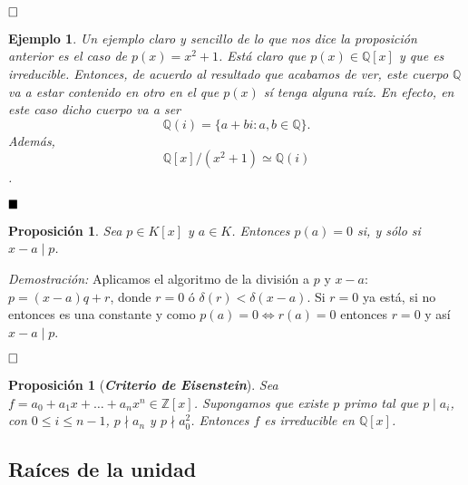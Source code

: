 \documentclass[12pt]{article}
\newtheorem{proposition}[theorem]{Proposición}
\newtheorem{example}{Ejemplo}[theorem]
\begin{document}
$\hfill \square$

\begin{example} Un ejemplo claro y sencillo de lo que nos dice la proposición anterior es el caso de $p(x) = x^{2}+1$. Está claro que $p(x) \in \mathbb{Q}[x]$ y que es irreducible. Entonces, de acuerdo al resultado que acabamos de ver, este cuerpo $\mathbb{Q}$ va a estar contenido en otro en el que $p(x)$ sí tenga alguna raíz. En efecto, en este caso dicho cuerpo va a ser $$\mathbb{Q}(i) = \lbrace a + bi :a,b \in \mathbb{Q} \rbrace.$$ Además, $$\mathbb{Q}[x]/(x^{2}+1) \simeq \mathbb{Q}(i)$$.
\end{example}

$\hfill \blacksquare$

\begin{proposition}\label{eq:ac2} Sea $p \in K[x]$ y $a \in K$. Entonces $p(a) = 0$ si, y sólo si $x-a \mid p$.
\end{proposition}
\emph{Demostración: } Aplicamos el algoritmo de la división a $p$ y $x-a$: $p=(x-a)q + r$, donde $r = 0$ ó $\delta(r) < \delta(x-a)$. Si $r= 0$ ya está, si no entonces es una constante y como $p(a) = 0 \Leftrightarrow r(a)= 0$ entonces $r = 0$ y así $x-a \mid p$.

$\hfill \square$

\begin{proposition}[\textbf{\textit{Criterio de Eisenstein}}] Sea $f= a_{0} + a_{1}x + \ldots + a_{n}x^{n} \in \mathbb{Z}[x]$. Supongamos que existe $p$ primo tal que $p \mid a_{i}$, con $0 \leq i \leq n-1$, $p \nmid a_{n}$ y $p \nmid a_{0}^{2}$. Entonces $f$ es irreducible en $\mathbb{Q}[x]$.
\end{proposition} 

\subsection{Raíces de la unidad} \label{eq:raicesUnidad}
\end{document}
